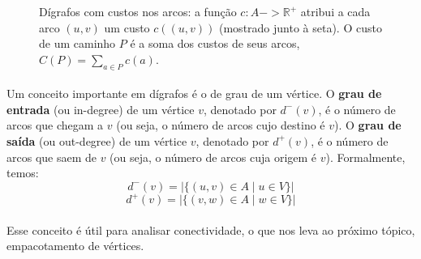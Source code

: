 \documentclass[12pt,a4paper]{article}
\def\\{}%
\def\emph#1{#1}%
\def\to{->}%
\begin{document}
\begin{figure}[H]
\centering
{}
\caption{Dígrafos com custos nos arcos: a função $c:A\to\mathbb{R}^+$ atribui a cada arco $(u,v)$ um custo $c((u,v))$ (mostrado junto à seta). O custo de um caminho $P$ é a soma dos custos de seus arcos, $C(P)=\sum_{a\in P} c(a)$.}
\label{fig:digrafo-custos}
\end{figure}

\paragraph{}
Um conceito importante em dígrafos é o de grau de um vértice. O \textbf{grau de entrada} (ou \emph{in-degree}) de um vértice \(v\), denotado por \(d^-(v)\), é o número de arcos que chegam a \(v\) (ou seja, o número de arcos cujo destino é \(v\)). O \textbf{grau de saída} (ou \emph{out-degree}) de um vértice \(v\), denotado por \(d^+(v)\), é o número de arcos que saem de \(v\) (ou seja, o número de arcos cuja origem é \(v\)). Formalmente, temos:
\[d^-(v) = |\{(u, v) \in A \mid u \in V\}|\]
\[d^+(v) = |\{(v, w) \in A \mid w \in V\}|\]

\paragraph{}
Esse conceito é útil para analisar conectividade, o que nos leva ao próximo tópico, empacotamento de vértices.
\end{document}
